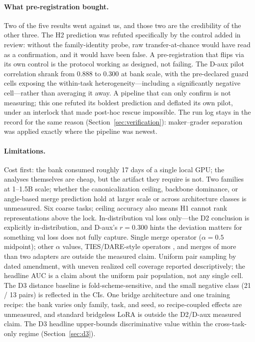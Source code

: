 \documentclass[10pt]{article}
\begin{document}
\paragraph{What pre-registration bought.} Two of the five results went
against us, and those two are the credibility of the other three. The H2
prediction was refuted specifically by the control added in review:
without the family-identity probe, raw transfer-at-chance would have read
as a confirmation, and it would have been false. A pre-registration that
flips via its own control is the protocol working as designed, not
failing. The D-aux pilot correlation shrank from 0.888 to 0.300 at bank
scale, with the pre-declared guard cells exposing the within-task
heterogeneity---including a significantly negative cell---rather than
averaging it away. A pipeline that can only confirm is not measuring;
this one refuted its boldest prediction and deflated its own pilot, under
an interlock that made post-hoc rescue impossible. The run log stays in
the record for the same reason (Section~\ref{sec:verification}):
maker--grader separation was applied exactly where the pipeline was
newest.

\paragraph{Limitations.} Cost first: the bank consumed roughly 17 days of
a single local GPU; the analyses themselves are cheap, but the artifact
they require is not. Two families at 1--1.5B scale; whether the
canonicalization ceiling, backbone dominance, or angle-based merge
prediction hold at larger scale or across architecture classes is
unmeasured. Six coarse tasks; ceiling accuracy also means H1 cannot rank
representations above the lock. In-distribution val loss only---the D2
conclusion is explicitly in-distribution, and D-aux's $r = 0.300$ hints
the deviation matters for something val loss does not fully capture.
Single merge operator ($\alpha = 0.5$ midpoint); other $\alpha$ values,
TIES/DARE-style operators \cite{yadav2023ties,yu2023dare}, and merges of
more than two adapters are outside the measured claim. Uniform pair
sampling by dated amendment, with uneven realized cell coverage reported
descriptively; the headline AUC is a claim about the uniform pair
population, not any single cell. The D3 distance baseline is
fold-scheme-sensitive, and the small negative class (21 / 13 pairs) is
reflected in the CIs. One bridge architecture and one training recipe:
the bank varies only family, task, and seed, so recipe-coupled effects
are unmeasured, and standard bridgeless LoRA is outside the D2/D-aux
measured claim. The D3 headline upper-bounds discriminative value within
the cross-task-only regime (Section~\ref{sec:d3}).
\end{document}
